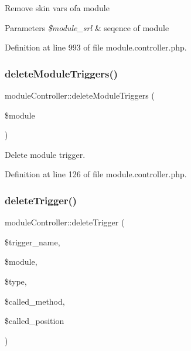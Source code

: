 Remove skin vars ofa module 
\begin{DoxyParams}{Parameters}
{\em \$module\+\_\+srl} & seqence of module \\
\hline
\end{DoxyParams}


Definition at line 993 of file module.\+controller.\+php.

\mbox{\label{classmoduleController_a48fb7491a1b86e30895ff4be5df7587d}} 
\subsubsection{\texorpdfstring{delete\+Module\+Triggers()}{deleteModuleTriggers()}}
{\footnotesize\ttfamily module\+Controller\+::delete\+Module\+Triggers (\begin{DoxyParamCaption}\item[{}]{\$module }\end{DoxyParamCaption})}



Delete module trigger. 



Definition at line 126 of file module.\+controller.\+php.

\mbox{\label{classmoduleController_a60dbf5d358cddb566b3d3e297a003d23}} 
\subsubsection{\texorpdfstring{delete\+Trigger()}{deleteTrigger()}}
{\footnotesize\ttfamily module\+Controller\+::delete\+Trigger (\begin{DoxyParamCaption}\item[{}]{\$trigger\+\_\+name,  }\item[{}]{\$module,  }\item[{}]{\$type,  }\item[{}]{\$called\+\_\+method,  }\item[{}]{\$called\+\_\+position }\end{DoxyParamCaption})}



